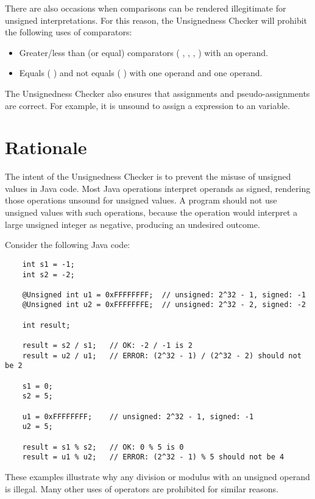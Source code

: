 There are also occasions when comparisons can be rendered illegitimate for
unsigned interpretations. For this reason, the Unsignedness Checker will prohibit the following uses of comparators:

\begin{itemize}

    \item
    Greater/less than (or equal) comparators
    ( \code{<}, \code{<=}, \code{>}, \code{>=} ) with an 
    operand.
    \item
    Equals ( \code{==} ) and not equals ( \code{!=} ) with one 
    operand and one  operand.

\end{itemize}

The Unsignedness Checker also ensures that assignments and pseudo-assignments are
correct. For example, it is unsound to assign a  expression to an
 variable.

\section{Rationale\label{unsignedness-checker-rationale}}

The intent of the Unsignedness Checker is to prevent the misuse of unsigned
values in Java code.  Most Java operations interpret operands as signed,
rendering those operations unsound for unsigned values. A program should not use
unsigned values with such operations, because the operation would interpret a
large unsigned integer as negative, producing an undesired outcome.

Consider the following Java code:

\begin{Verbatim}
    int s1 = -1;
    int s2 = -2;

    @Unsigned int u1 = 0xFFFFFFFF;  // unsigned: 2^32 - 1, signed: -1
    @Unsigned int u2 = 0xFFFFFFFE;  // unsigned: 2^32 - 2, signed: -2

    int result;

    result = s2 / s1;   // OK: -2 / -1 is 2
    result = u2 / u1;   // ERROR: (2^32 - 1) / (2^32 - 2) should not be 2

    s1 = 0;
    s2 = 5;

    u1 = 0xFFFFFFFF;    // unsigned: 2^32 - 1, signed: -1
    u2 = 5;

    result = s1 % s2;   // OK: 0 % 5 is 0
    result = u1 % u2;   // ERROR: (2^32 - 1) % 5 should not be 4
\end{Verbatim}

These examples illustrate why any division or modulus with an unsigned operand
is illegal. Many other uses of operators are prohibited for similar reasons.
